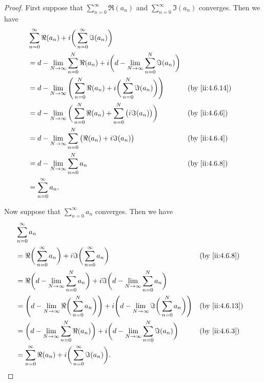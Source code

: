 \begin{proof}
  First suppose that \(\sum_{n = 0}^\infty \Re(a_n)\) and \(\sum_{n = 0}^\infty \Im(a_n)\) converges.
  Then we have
  \begin{align*}
     & \sum_{n = 0}^\infty \Re(a_n) + i \bigg(\sum_{n = 0}^\infty \Im(a_n)\bigg)                                                             \\
     & = d - \lim_{N \to \infty} \sum_{n = 0}^N \Re(a_n) + i \bigg(d - \lim_{N \to \infty} \sum_{n = 0}^N \Im(a_n)\bigg)                     \\
     & = d - \lim_{N \to \infty} \Bigg(\sum_{n = 0}^N \Re(a_n) + i \bigg(\sum_{n = 0}^N \Im(a_n)\bigg)\Bigg)             &  & \by{ii:4.6.14} \\
     & = d - \lim_{N \to \infty} \bigg(\sum_{n = 0}^N \Re(a_n) + \sum_{n = 0}^N \big(i \Im(a_n)\big)\bigg)               &  & \by{ii:4.6.6}  \\
     & = d - \lim_{N \to \infty} \sum_{n = 0}^N \big(\Re(a_n) + i \Im(a_n)\big)                                          &  & \by{ii:4.6.4}  \\
     & = d - \lim_{N \to \infty} \sum_{n = 0}^N a_n                                                                      &  & \by{ii:4.6.8}  \\
     & = \sum_{n = 0}^\infty a_n.
  \end{align*}

  Now suppose that \(\sum_{n = 0}^\infty a_n\) converges.
  Then we have
  \begin{align*}
     & \sum_{n = 0}^\infty a_n                                                                                                                                               \\
     & = \Re\bigg(\sum_{n = 0}^\infty a_n\bigg) + i \Im\bigg(\sum_{n = 0}^\infty a_n\bigg)                                                               &  & \by{ii:4.6.8}  \\
     & = \Re\bigg(d - \lim_{N \to \infty} \sum_{n = 0}^N a_n\bigg) + i \Im\bigg(d - \lim_{N \to \infty} \sum_{n = 0}^N a_n\bigg)                                             \\
     & = \Bigg(d - \lim_{N \to \infty} \Re\bigg(\sum_{n = 0}^N a_n\bigg)\Bigg) + i \Bigg(d - \lim_{N \to \infty} \Im\bigg(\sum_{n = 0}^N a_n\bigg)\Bigg) &  & \by{ii:4.6.13} \\
     & = \bigg(d - \lim_{N \to \infty} \sum_{n = 0}^N \Re(a_n)\bigg) + i \bigg(d - \lim_{N \to \infty} \sum_{n = 0}^N \Im(a_n)\bigg)                     &  & \by{ii:4.6.3}  \\
     & = \sum_{n = 0}^\infty \Re(a_n) + i \bigg(\sum_{n = 0}^\infty \Im(a_n)\bigg).
  \end{align*}
\end{proof}

